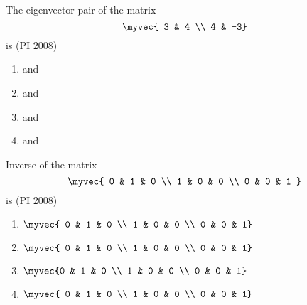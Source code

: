 \item 
The eigenvector pair of the matrix
$$\myvec {
3 & 4 \\
4 & -3}$$
 is
    \hfill{(PI 2008)}
    \begin{multicols}{4}
    \begin{enumerate}
   \item {}  and 
\item  {} and 
    \item
       and  
\item  {} and 
\end{enumerate}
\end{multicols}
 \item 
 Inverse of the matrix 
$$ \myvec{
 0 & 1 & 0 \\
 1 & 0 & 0 \\
 0 & 0 & 1 }
 $$
  is  \hfill{(PI 2008)}
    \begin{multicols}{4}
    \begin{enumerate}
        \item $\myvec
           { 0 & 1 & 0 \\
            1 & 0 & 0 \\
            0 & 0 & 1} $
        
        \item $\myvec{
            0 & 1 & 0 \\
            1 & 0 & 0 \\
            0 & 0 & 1} 
        $
        \item $\myvec
            {0 & 1 & 0 \\
            1 & 0 & 0 \\
            0 & 0 & 1} 
        $
        \item $\myvec
           { 0 & 1 & 0 \\
            1 & 0 & 0 \\
            0 & 0 & 1} 
        $
    \end{enumerate}
\end{multicols}

